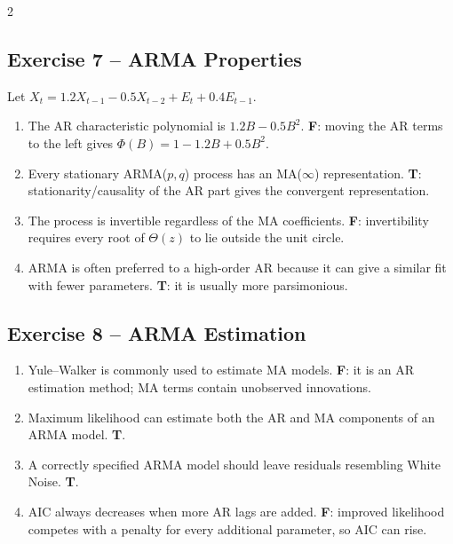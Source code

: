 \documentclass[9pt,a4paper]{extarticle}
\begin{document}
\begin{multicols}{2}
\subsection*{Exercise 7 -- ARMA Properties}
Let \(X_t=1.2X_{t-1}-0.5X_{t-2}+E_t+0.4E_{t-1}\).
\begin{enumerate}[label=\alph*),leftmargin=4mm]
\item The AR characteristic polynomial is \(1.2B-0.5B^2\). \textbf{F}: moving the AR terms to the left gives \(\Phi(B)=1-1.2B+0.5B^2\).
\item Every stationary ARMA(\(p,q\)) process has an MA(\(\infty\)) representation. \textbf{T}: stationarity/causality of the AR part gives the convergent representation.
\item The process is invertible regardless of the MA coefficients. \textbf{F}: invertibility requires every root of \(\Theta(z)\) to lie outside the unit circle.
\item ARMA is often preferred to a high-order AR because it can give a similar fit with fewer parameters. \textbf{T}: it is usually more parsimonious.
\end{enumerate}

\subsection*{Exercise 8 -- ARMA Estimation}
\begin{enumerate}[label=\alph*),leftmargin=4mm]
\item Yule--Walker is commonly used to estimate MA models. \textbf{F}: it is an AR estimation method; MA terms contain unobserved innovations.
\item Maximum likelihood can estimate both the AR and MA components of an ARMA model. \textbf{T}.
\item A correctly specified ARMA model should leave residuals resembling White Noise. \textbf{T}.
\item AIC always decreases when more AR lags are added. \textbf{F}: improved likelihood competes with a penalty for every additional parameter, so AIC can rise.
\end{enumerate}


\end{multicols}
\end{document}
